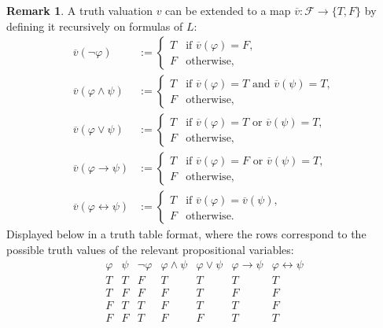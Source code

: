 \documentclass[12pt]{article}
\theoremstyle{definition}
\newtheorem{remark}[theorem]{Remark}
\renewcommand{\phi}{\varphi}
\newcommand{\<}{\langle}
\renewcommand{\>}{\rangle}
\newcommand{\clo}{\overline}
\newcommand{\FF}{\mathcal{F}}
\newcommand{\liff}{\leftrightarrow}
\begin{document}
\begin{remark}
    A truth valuation $v$ can be extended to a map $\clo{v} : \FF \to \{T, F\}$ by defining it recursively on formulas of $L$:
    \begin{align*}
        \clo{v}(\lnot \phi) &:= \begin{cases}
            T & \text{if } \clo{v}(\phi) = F, \\
            F & \text{otherwise},
        \end{cases} \\
        \clo{v}(\phi \land \psi) &:= \begin{cases}
            T & \text{if } \clo{v}(\phi) = T \text{ and } \clo{v}(\psi) = T, \\
            F & \text{otherwise},
        \end{cases} \\
        \clo{v}(\phi \lor \psi) &:= \begin{cases}
            T & \text{if } \clo{v}(\phi) = T \text{ or } \clo{v}(\psi) = T, \\
            F & \text{otherwise},
        \end{cases} \\
        \clo{v}(\phi \to \psi) &:= \begin{cases}
            T & \text{if } \clo{v}(\phi) = F \text{ or } \clo{v}(\psi) = T, \\
            F & \text{otherwise},
        \end{cases} \\
        \clo{v}(\phi \liff \psi) &:= \begin{cases}
            T & \text{if } \clo{v}(\phi) = \clo{v}(\psi), \\
            F & \text{otherwise}.
        \end{cases}
    \end{align*}
    Displayed below in a truth table format, where the rows correspond to the possible truth values of the relevant propositional variables:
    \[
        \begin{array}{cc|c|c|c|c|c}
            \phi & \psi & \lnot\phi & \phi\land\psi & \phi\lor\psi & \phi\to\psi & \phi\liff\psi \\
            \hline
            T & T & F & T & T & T & T \\
            T & F & F & F & T & F & F \\
            F & T & T & F & T & T & F \\
            F & F & T & F & F & T & T
        \end{array}
    \]
\end{remark}
\end{document}
